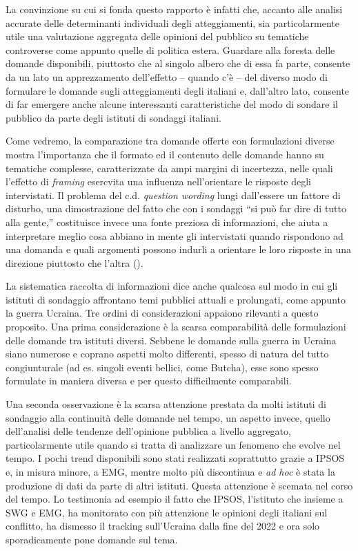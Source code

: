 \documentclass[
]{book}
\begin{document}
La convinzione su cui si fonda questo rapporto è infatti che, accanto alle analisi accurate delle determinanti individuali degli atteggiamenti, sia particolarmente utile una valutazione aggregata delle opinioni del pubblico su tematiche controverse come appunto quelle di politica estera. Guardare alla foresta delle domande disponibili, piuttosto che al singolo albero che di essa fa parte, consente da un lato un apprezzamento dell'effetto -- quando c'è -- del diverso modo di formulare le domande sugli atteggiamenti degli italiani e, dall'altro lato, consente di far emergere anche alcune interessanti caratteristiche del modo di sondare il pubblico da parte degli istituti di sondaggi italiani.

Come vedremo, la comparazione tra domande offerte con formulazioni diverse mostra l'importanza che il formato ed il contenuto delle domande hanno su tematiche complesse, caratterizzate da ampi margini di incertezza, nelle quali l'effetto di \emph{framing} esercvita una influenza nell'orientare le risposte degli intervistati. Il problema del c.d. \emph{question wording} lungi dall'essere un fattore di disturbo, una dimostrazione del fatto che con i sondaggi ``si può far dire di tutto alla gente,'' costituisce invece una fonte preziosa di informazioni, che aiuta a interpretare meglio cosa abbiano in mente gli intervistati quando rispondono ad una domanda e quali argomenti possono indurli a orientare le loro risposte in una direzione piuttosto che l'altra (\citet{Sudman-Bradburn1974}).

La sistematica raccolta di informazioni dice anche qualcosa sul modo in cui gli istituti di sondaggio affrontano temi pubblici attuali e prolungati, come appunto la guerra Ucraina. Tre ordini di considerazioni appaiono rilevanti a questo proposito. Una prima considerazione è la scarsa comparabilità delle formulazioni delle domande tra istituti diversi. Sebbene le domande sulla guerra in Ucraina siano numerose e coprano aspetti molto differenti, spesso di natura del tutto congiunturale (ad es. singoli eventi bellici, come Butcha), esse sono spesso formulate in maniera diversa e per questo difficilmente comparabili.

Una seconda osservazione è la scarsa attenzione prestata da molti istituti di sondaggio alla continuità delle domande nel tempo, un aspetto invece, quello dell'analisi delle tendenze dell'opinione pubblica a livello aggregato, particolarmente utile quando si tratta di analizzare un fenomeno che evolve nel tempo. I pochi trend disponibili sono stati realizzati soprattutto grazie a IPSOS e, in misura minore, a EMG, mentre molto più discontinua e \emph{ad hoc} è stata la produzione di dati da parte di altri istituti. Questa attenzione è scemata nel corso del tempo. Lo testimonia ad esempio il fatto che IPSOS, l'istituto che insieme a SWG e EMG, ha monitorato con più attenzione le opinioni degli italiani sul conflitto, ha dismesso il tracking sull'Ucraina dalla fine del 2022 e ora solo sporadicamente pone domande sul tema.
\end{document}
